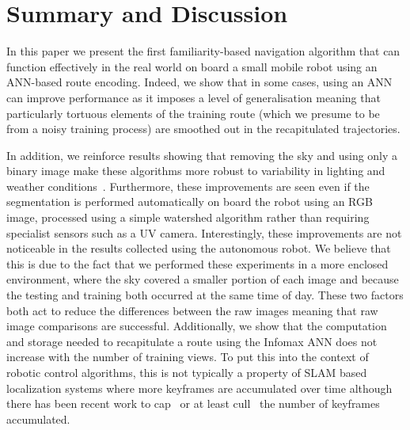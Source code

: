 \documentclass[letterpaper]{article}
\begin{document}
\section{Summary and Discussion}
In this paper we present the first familiarity-based navigation algorithm that can function effectively in the real world on board a small mobile robot using an ANN-based route encoding. 
Indeed, we show that in some cases, using an ANN can improve performance as it imposes a level of generalisation meaning that particularly tortuous elements of the training route (which we presume to be from a noisy training process) are smoothed out in the recapitulated trajectories.

In addition, we reinforce results showing that removing the sky and using only a binary image make these algorithms more robust to variability in lighting and weather conditions~\citep{Philippides2011,Stone2014}. 
Furthermore, these improvements are seen even if the segmentation is performed automatically on board the robot using an RGB image, processed using a simple watershed algorithm rather than requiring specialist sensors such as a UV camera.
Interestingly, these improvements are not noticeable in the results collected using the autonomous robot.
We believe that this is due to the fact that we performed these experiments in a more enclosed environment, where the sky covered a smaller portion of each image and because the testing and training both occurred at the same time of day.
These two factors both act to reduce the differences between the raw images meaning that raw image comparisons are successful.
Additionally, we show that the computation and storage needed to recapitulate a route using the Infomax ANN does not increase with the number of training views.
To put this into the context of robotic control algorithms, this is not typically a property of SLAM based localization systems where more keyframes are accumulated over time although there has been recent work to cap~\citep{Maddern2012} or at least cull~\citep{Mur-Artal2015} the number of keyframes accumulated.
\end{document}
